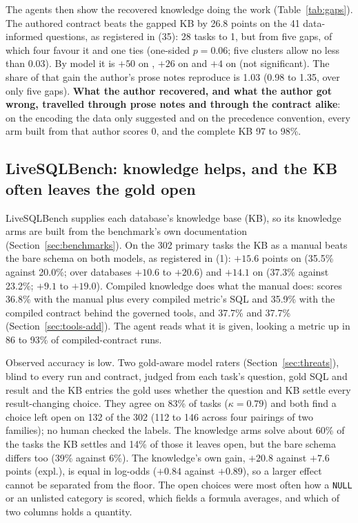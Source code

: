 The agents then show the recovered knowledge doing the work
(Table~\ref{tab:gaps}). The authored contract beats the gapped KB by 26.8
points on the 41 data-informed questions, as registered in (35): 28 tasks
to 1, but from five gaps, of which four favour it and one ties (one-sided
$p{=}0.06$; five clusters allow no less than 0.03). By model it is $+50$
on \mLuna{}, $+26$ on \mSol{} and $+4$ on \mQwen{} (not significant). The
share of that gain the author's prose notes reproduce is 1.03 (0.98 to
1.35, over only five gaps). \textbf{What the author recovered, and what
the author got wrong, travelled through prose notes and through the
contract alike}: on the encoding the data only suggested and on the
precedence convention, every arm built from that author scores 0, and the
complete KB 97 to 98\%.

\subsection{LiveSQLBench: knowledge helps, and the KB often leaves the
gold open}
\label{sec:lsb-knowledge}

LiveSQLBench supplies each database's knowledge base (KB), so its
knowledge arms are built from the benchmark's own documentation
(Section~\ref{sec:benchmarks}). On the 302 primary tasks the KB as a
manual beats the bare schema on both models, as registered in (1):
$+15.6$ points on \mLuna{} (35.5\% against 20.0\%; over databases $+10.6$
to $+20.6$) and $+14.1$ on \mQwen{} (37.3\% against 23.2\%; $+9.1$ to
$+19.0$). Compiled knowledge does what the manual does: \mLuna{} scores
36.8\% with the manual plus every compiled metric's SQL and 35.9\% with
the compiled contract behind the governed tools, and \mQwen{} 37.7\% and
37.7\% (Section~\ref{sec:tools-add}). The agent reads what it is given,
looking a metric up in 86 to 93\% of compiled-contract runs.

Observed accuracy is low. Two gold-aware model raters
(Section~\ref{sec:threats}), blind to every run and contract, judged from
each task's question, gold SQL and result and the KB entries the gold uses
whether the question and KB settle every result-changing choice. They agree
on 83\% of tasks ($\kappa{=}0.79$) and both find a choice left open on 132
of the 302 (112 to 146 across four pairings of two families); no human
checked the labels. The knowledge arms solve about 60\% of the tasks the KB
settles and 14\% of those it leaves open, but the bare schema differs too
(39\% against 6\%). The knowledge's own gain, $+20.8$ against $+7.6$ points
(expl.), is equal in log-odds ($+0.84$ against $+0.89$), so a larger effect
cannot be separated from the floor. The open choices were most often how a \texttt{NULL} or an unlisted category is
scored, which fields a formula averages, and which of two columns holds a
quantity.


